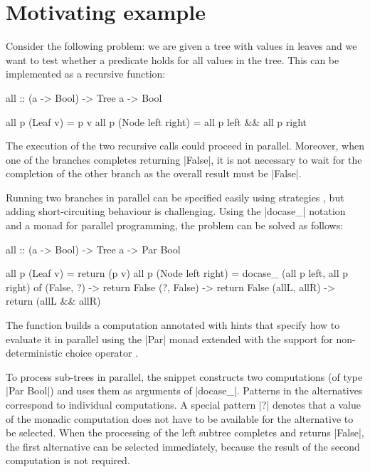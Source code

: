\documentclass{sigplanconf}
\begin{document}

\section{Motivating example}
\label{sec:motivation}

Consider the following problem: we are given a tree with values in leaves and we want to test
whether a predicate holds for all values in the tree. This can be implemented as a recursive function:

\begin{code}
all :: (a -> Bool) -> Tree a -> Bool

all p (Leaf v)           = p v
all p (Node left right)  = all p left && all p right
\end{code}
The execution of the two recursive calls could proceed in parallel. Moreover, when one of the 
branches completes returning |False|, it is not necessary to wait for the completion of the other 
branch as the overall result must be |False|.

Running two branches in parallel can be specified easily using strategies \cite{strategies-new, strategies-old}, 
but adding short-circuiting behaviour is challenging. Using the |docase_| notation and a monad for 
parallel programming, the problem can be solved as follows:

\begin{code}
all :: (a -> Bool) -> Tree a -> Par Bool

all p (Leaf v)           = return (p v)
all p (Node left right)  = 
  docase_ (all p left, all p right) of
    (False, ?)    -> return False
    (?, False)    -> return False
    (allL, allR)  -> return (allL && allR)
\end{code}
The function builds a computation annotated with hints that specify how to evaluate it in parallel 
using the |Par| monad \cite{parmonad} extended with the support for non-deterministic choice 
operator \cite{parmonad-cancellation}.

To process sub-trees in parallel, the snippet constructs two computations (of type |Par Bool|) 
and uses them as arguments of |docase_|. Patterns in the alternatives correspond to individual
computations. A special pattern |?| denotes that a value of the monadic computation does not 
have to be available for the alternative to be selected. When the processing of the left subtree 
completes and returns |False|, the first alternative can be selected immediately, because the 
result of the second computation is not required.
\end{document}
